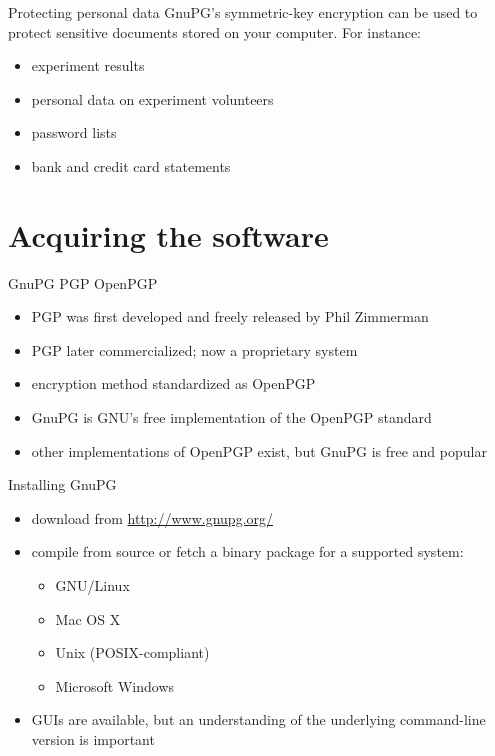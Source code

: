 \documentclass[%
mode=present,%
paper=smartboard,
size=20pt,
]{powerdot}
\begin{document}
\begin{slide}{Protecting personal data}
  GnuPG's symmetric-key encryption can be used to protect sensitive
  documents stored on your computer.  For instance:\\[1ex]
  \begin{itemize}
  \item experiment results
  \item personal data on experiment volunteers
  \item password lists
  \item bank and credit card statements
  \end{itemize}
\end{slide}


\section{Acquiring the software}

\begin{slide}{GnuPG \vs PGP \vs OpenPGP}
  \begin{itemize}
  \item PGP was first developed and freely released by Phil Zimmerman
  \item PGP later commercialized; now a proprietary system
  \item encryption method standardized as OpenPGP
  \item GnuPG is GNU's free implementation of the OpenPGP standard
  \item other implementations of OpenPGP exist, but GnuPG is free and
    popular
  \end{itemize}
\end{slide}

\begin{slide}{Installing GnuPG}
  \begin{itemize}
  \item download from \url{http://www.gnupg.org/}
  \item compile from source or fetch a binary package for a supported
    system:
    \begin{itemize}
    \item GNU/Linux
    \item Mac OS X
    \item Unix (POSIX-compliant)
    \item Microsoft Windows
    \end{itemize}
  \item GUIs are available, but an understanding of the underlying
    command-line version is important
  \end{itemize}
\end{slide}
\end{document}
